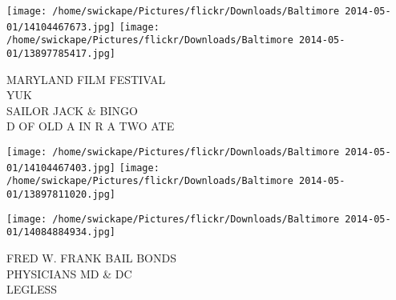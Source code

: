 \documentclass[10pt,letterpaper]{article}
\begin{document}
\texttt{[image: /home/swickape/Pictures/flickr/Downloads/Baltimore 2014-05-01/14104467673.jpg]}
\texttt{[image: /home/swickape/Pictures/flickr/Downloads/Baltimore 2014-05-01/13897785417.jpg]}

MARYLAND FILM FESTIVAL\\
YUK\\
SAILOR JACK \& BINGO\\
D OF OLD A IN R A TWO ATE
\pagebreak

\texttt{[image: /home/swickape/Pictures/flickr/Downloads/Baltimore 2014-05-01/14104467403.jpg]}
\texttt{[image: /home/swickape/Pictures/flickr/Downloads/Baltimore 2014-05-01/13897811020.jpg]}

\texttt{[image: /home/swickape/Pictures/flickr/Downloads/Baltimore 2014-05-01/14084884934.jpg]}

FRED W. FRANK BAIL BONDS\\
PHYSICIANS MD \& DC\\
LEGLESS
\pagebreak
\end{document}
